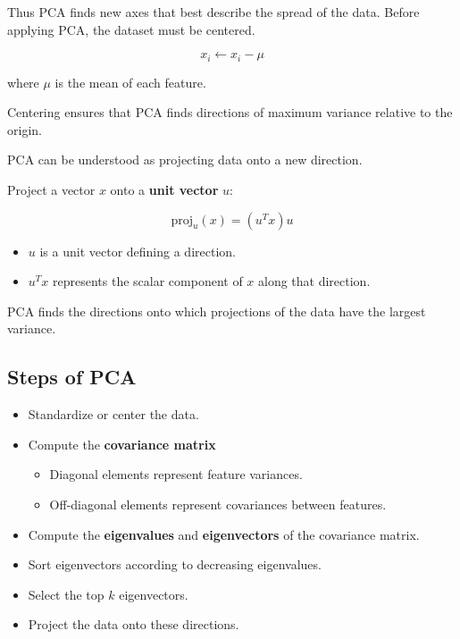 \documentclass[10pt,a4paper]{article}
\begin{document}
	Thus PCA finds new axes that best describe the spread of the data.
	Before applying PCA, the dataset must be centered.

	\[
	x_i \leftarrow x_i - \mu
	\]

	where $\mu$ is the mean of each feature.

	Centering ensures that PCA finds directions of maximum variance relative to the origin.

	PCA can be understood as projecting data onto a new direction.

	Project a vector $x$ onto a \textbf{unit vector} $u$:

	\[
	\text{proj}_u(x) = (u^T x)u
	\]

	\begin{itemize}
		\item $u$ is a unit vector defining a direction.
		\item $u^T x$ represents the scalar component of $x$ along that direction.
	\end{itemize}

	PCA finds the directions onto which projections of the data have the largest variance.

	\subsection{Steps of PCA}

	\begin{itemize}

		\item Standardize or center the data.

		\item Compute the \textbf{covariance matrix}

		\begin{itemize}
			\item Diagonal elements represent feature variances.
			\item Off-diagonal elements represent covariances between features.
		\end{itemize}

		\item Compute the \textbf{eigenvalues} and \textbf{eigenvectors} of the covariance matrix.

		\item Sort eigenvectors according to decreasing eigenvalues.

		\item Select the top $k$ eigenvectors.

		\item Project the data onto these directions.

	\end{itemize}
\end{document}
